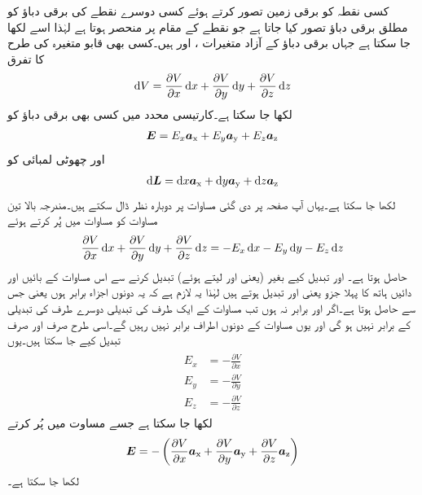 کسی نقطہ کو برقی زمین تصور کرتے ہوئے کسی دوسرے نقطے کی برقی دباؤ کو مطلق برقی دباؤ تصور کیا جاتا ہے جو نقطے کے مقام پر منحصر ہوتا ہے لہٰذا اسے  لکھا جا سکتا ہے جہاں برقی دباؤ کے آزاد متغیرات ،  اور  ہیں۔کسی بھی قابو متغیرہ کی طرح  کا تفرق
\begin{align}\label{مساوات_توانائی_دباو_کارتیسی_تفرق}
\dif V=\frac{\partial V}{\partial x} \dif x+\frac{\partial V}{\partial y} \dif y +\frac{\partial V}{\partial z} \dif z
\end{align}
لکھا جا سکتا ہے۔کارتیسی محدد میں کسی بھی برقی دباؤ کو
\begin{align}\label{مساوات_توانائی_میدان}
{\ensuremath{{\boldsymbol{E}}}}=E_x {\boldsymbol{a}}_{\textup{x}}+ E_y {\boldsymbol{a}}_{\textup{y}}+E_z {\boldsymbol{a}}_{\textup{z}}
\end{align}
اور  چھوٹی لمبائی کو
\begin{align}\label{مساوات_توانائی_کارتیسی_چھوٹا_فاصلہ}
\dif \kvec{L}=\dif x \ax+\dif y \ay+\dif z \az
\end{align}
لکھا جا سکتا ہے۔یہاں آپ صفحہ  پر دی گئی مساوات  پر دوبارہ نظر ڈال سکتے ہیں۔مندرجہ بالا تین مساوات کو مساوات  میں پُر کرتے ہوئے
\begin{align}\label{مساوات_توانائی_دباو_اور_میدان}
\frac{\partial V}{\partial x} \dif x+\frac{\partial V}{\partial y} \dif y +\frac{\partial V}{\partial z} \dif z=-E_x \dif x-E_y \dif y-E_z \dif z
\end{align}
حاصل ہوتا ہے۔ اور  تبدیل کیے بغیر (یعنی  اور  لیتے ہوئے)  تبدیل کرنے سے اس مساوات کے بائیں اور دائیں ہاتھ کا پہلا جزو یعنی  اور  تبدیل ہوتے ہیں لہٰذا یہ لازم ہے کہ یہ دونوں اجزاء برابر ہوں یعنی  جس سے  حاصل ہوتا ہے۔اگر  اور  برابر نہ ہوں تب مساوات کے ایک طرف کی تبدیلی دوسرے طرف کی تبدیلی کے برابر نہیں ہو گی اور یوں مساوات کے دونوں اطراف برابر نہیں رہیں گے۔اسی طرح صرف  اور صرف  تبدیل کیے جا سکتا ہیں۔یوں
\begin{gather}
\begin{aligned}
E_x&=-\frac{\partial V}{\partial x}\\
E_y&=-\frac{\partial V}{\partial y}\\
E_z&=-\frac{\partial V}{\partial z}
\end{aligned}
\end{gather}
لکھا جا سکتا ہے جسے مساوت  میں پُر کرتے
\begin{align}\label{مساوات_توانائی_ڈھلوان_تعریف_الف}
{\ensuremath{{\boldsymbol{E}}}}=-\left( \frac{\partial V}{\partial x} {\boldsymbol{a}}_{\textup{x}}+\frac{\partial V}{\partial y} {\boldsymbol{a}}_{\textup{y}}+\frac{\partial V}{\partial z} {\boldsymbol{a}}_{\textup{z}}\right)
\end{align}
لکھا جا سکتا ہے۔

